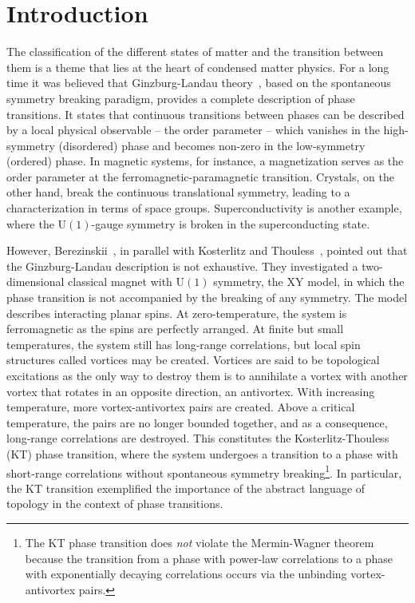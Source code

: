 \cleardoublepage{}
\chapter*{Introduction}
\label{ch:introduction}
The classification of the different states of matter and the transition between them is a theme that lies at the heart of condensed matter physics. For a long time it was believed that Ginzburg-Landau theory~\cite{Landau1950}, based on the spontaneous symmetry breaking paradigm, provides a complete description of phase transitions. It states that continuous transitions between phases can be described by a local physical observable -- the order parameter -- which vanishes in the high-symmetry (disordered) phase and becomes non-zero in the low-symmetry (ordered) phase. In magnetic systems, for instance, a magnetization serves as the order parameter at the ferromagnetic-paramagnetic transition. Crystals, on the other hand, break the continuous translational symmetry, leading to a characterization in terms of space groups. Superconductivity is another example, where the $\mathrm{U}(1)$-gauge symmetry is broken in the superconducting state.

However, Berezinskii~\cite{Berezinsky:1970fr, Berezinsky:1972rfj}, in parallel with Kosterlitz and Thouless~\cite{Kosterlitz_1972, Kosterlitz_1973}, pointed out that the Ginzburg-Landau description is not exhaustive. They investigated a two-dimensional classical magnet with $\mathrm{U}(1)$ symmetry, the XY model, in which the phase transition is not accompanied by the breaking of any symmetry. The model describes interacting planar spins. At zero-temperature, the system is ferromagnetic as the spins are perfectly arranged. At finite but small temperatures, the system still has long-range correlations, but local spin structures called vortices may be created. Vortices are said to be topological excitations as the only way to destroy them is to annihilate a vortex with another vortex that rotates in an opposite direction, an antivortex. With increasing temperature, more vortex-antivortex pairs are created. Above a critical temperature, the pairs are no longer bounded together, and as a consequence, long-range correlations are destroyed. This constitutes the Kosterlitz-Thouless (KT) phase transition, where the system undergoes a transition to a phase with short-range correlations without spontaneous symmetry breaking\footnote{The KT phase transition does \emph{not} violate the Mermin-Wagner theorem because the transition from a phase with power-law correlations to a phase with exponentially decaying correlations occurs via the unbinding vortex-antivortex pairs.}. In particular, the KT transition exemplified the importance of the abstract language of topology in the context of phase transitions. 


